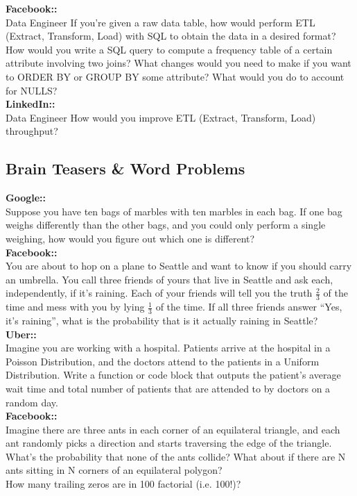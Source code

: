\documentclass[11pt]{article}
\begin{document}
{\bf Facebook:: }\\
Data Engineer If you’re given a raw data table, how would perform ETL (Extract, Transform, Load) with SQL to obtain the data in a desired format?\\
How would you write a SQL query to compute a frequency table of a certain attribute involving two joins? What changes would you need to make if you want to ORDER BY or GROUP BY some attribute? What would you do to account for NULLS? \\

{\bf LinkedIn:: }\\
Data Engineer How would you improve ETL (Extract, Transform, Load) throughput?\\


\subsection{Brain Teasers \& Word Problems}
{\bf Google:: }\\
Suppose you have ten bags of marbles with ten marbles in each bag. If one bag weighs differently than the other bags, and you could only perform a single weighing, how would you figure out which one is different?\\

{\bf Facebook:: }\\
You are about to hop on a plane to Seattle and want to know if you should carry an umbrella. You call three friends of yours that live in Seattle and ask each, independently, if it’s raining. Each of your friends will tell you the truth $\frac{2}{3}$ of the time and mess with you by lying $\frac{1}{3}$ of the time. If all three friends answer ``Yes, it’s raining'', what is the probability that is it actually raining in Seattle?\\

{\bf Uber:: }\\
Imagine you are working with a hospital. Patients arrive at the hospital in a Poisson Distribution, and the doctors attend to the patients in a Uniform Distribution. Write a function or code block that outputs the patient’s average wait time and total number of patients that are attended to by doctors on a random day.\\

{\bf Facebook:: }\\
Imagine there are three ants in each corner of an equilateral triangle, and each ant randomly picks a direction and starts traversing the edge of the triangle. What’s the probability that none of the ants collide? What about if there are N ants sitting in N corners of an equilateral polygon?\\
How many trailing zeros are in 100 factorial (i.e. 100!)?\\
\end{document}
